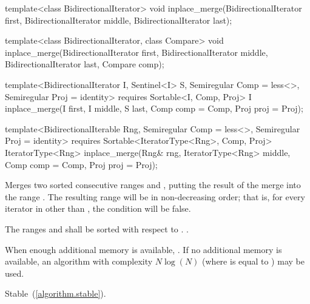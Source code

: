 %
\begin{removedblock}
\begin{itemdecl}
template<class BidirectionalIterator>
  void inplace_merge(BidirectionalIterator first,
                     BidirectionalIterator middle,
                     BidirectionalIterator last);

template<class BidirectionalIterator, class Compare>
  void inplace_merge(BidirectionalIterator first,
                     BidirectionalIterator middle,
                     BidirectionalIterator last, Compare comp);
\end{itemdecl}
\end{removedblock}
\begin{addedblock}
\begin{itemdecl}
template<BidirectionalIterator I, Sentinel<I> S, Semiregular Comp = less<>,
    Semiregular Proj = identity>
  requires Sortable<I, Comp, Proj>
  I
    inplace_merge(I first, I middle, S last, Comp comp = Comp{}, Proj proj = Proj{});

template<BidirectionalIterable Rng, Semiregular Comp = less<>, Semiregular Proj = identity>
  requires Sortable<IteratorType<Rng>, Comp, Proj>
  IteratorType<Rng>
    inplace_merge(Rng& rng, IteratorType<Rng> middle, Comp comp = Comp{},
                  Proj proj = Proj{});
\end{itemdecl}
\end{addedblock}

\begin{itemdescr}
\pnum
\effects
Merges two sorted consecutive ranges
and
,
putting the result of the merge into the range
.
The resulting range will be in non-decreasing order;
that is, for every iterator
in
other than
,
the condition
will be false.

\pnum
\requires
The ranges  and  shall be
sorted with respect to  .
.

\begin{addedblock}
\pnum
\returns {}
\end{addedblock}

\pnum
\complexity
When enough additional memory is available,
.
If no additional memory is available, an algorithm with complexity
$N \log(N)$
(where
is equal to
)
may be used.

\pnum
\remarks Stable~(\ref{algorithm.stable}).
\end{itemdescr}

